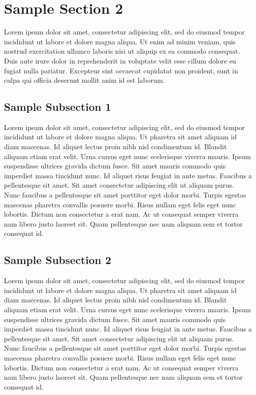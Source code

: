 \documentclass[a4paper, 12pt]{report}
\begin{document}
\section{Sample Section 2}
Lorem ipsum dolor sit amet, consectetur adipiscing elit, sed do eiusmod tempor incididunt ut labore et dolore magna aliqua. Ut enim ad minim veniam, quis nostrud exercitation ullamco laboris nisi ut aliquip ex ea commodo consequat. Duis aute irure dolor in reprehenderit in voluptate velit esse cillum dolore eu fugiat nulla pariatur. Excepteur sint occaecat cupidatat non proident, sunt in culpa qui officia deserunt mollit anim id est laborum.

\subsection{Sample Subsection 1}
Lorem ipsum dolor sit amet, consectetur adipiscing elit, sed do eiusmod tempor incididunt ut labore et dolore magna aliqua. Ut pharetra sit amet aliquam id diam maecenas. Id aliquet lectus proin nibh nisl condimentum id. Blandit aliquam etiam erat velit. Urna cursus eget nunc scelerisque viverra mauris. Ipsum suspendisse ultrices gravida dictum fusce. Sit amet mauris commodo quis imperdiet massa tincidunt nunc. Id aliquet risus feugiat in ante metus. Faucibus a pellentesque sit amet. Sit amet consectetur adipiscing elit ut aliquam purus. Nunc faucibus a pellentesque sit amet porttitor eget dolor morbi. Turpis egestas maecenas pharetra convallis posuere morbi. Risus nullam eget felis eget nunc lobortis. Dictum non consectetur a erat nam. Ac ut consequat semper viverra nam libero justo laoreet sit. Quam pellentesque nec nam aliquam sem et tortor consequat id.

\subsection{Sample Subsection 2}
Lorem ipsum dolor sit amet, consectetur adipiscing elit, sed do eiusmod tempor incididunt ut labore et dolore magna aliqua. Ut pharetra sit amet aliquam id diam maecenas. Id aliquet lectus proin nibh nisl condimentum id. Blandit aliquam etiam erat velit. Urna cursus eget nunc scelerisque viverra mauris. Ipsum suspendisse ultrices gravida dictum fusce. Sit amet mauris commodo quis imperdiet massa tincidunt nunc. Id aliquet risus feugiat in ante metus. Faucibus a pellentesque sit amet. Sit amet consectetur adipiscing elit ut aliquam purus. Nunc faucibus a pellentesque sit amet porttitor eget dolor morbi. Turpis egestas maecenas pharetra convallis posuere morbi. Risus nullam eget felis eget nunc lobortis. Dictum non consectetur a erat nam. Ac ut consequat semper viverra nam libero justo laoreet sit. Quam pellentesque nec nam aliquam sem et tortor consequat id.
\end{document}
